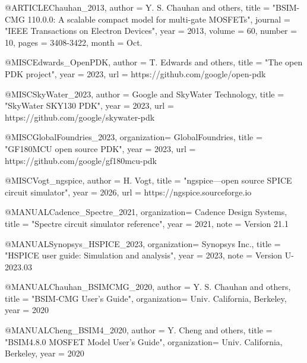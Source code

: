 \documentclass[conference]{IEEEtran}
\begin{document}
\begin{thebibliography}
@ARTICLE{Chauhan_2013,
    author      =   {Y. S. {Chauhan} and others},
    title       =   "{BSIM-CMG 110.0.0: A scalable compact model for multi-gate {MOSFETs}}",
    journal     =   "{IEEE Transactions on Electron Devices}",
    year        =   {2013},
    volume      =   {60},
    number      =   {10},
    pages       =   {3408-3422},
    month       =   {Oct.}
}

@MISC{Edwards_OpenPDK,
    author      =   {T. {Edwards} and others},
    title       =   "{The open {PDK} project}",
    year        =   {2023},
    url         =   {https://github.com/google/open-pdk}
}

@MISC{SkyWater_2023,
    author      =   {{Google} and {SkyWater Technology}},
    title       =   "{SkyWater SKY130 {PDK}}",
    year        =   {2023},
    url         =   {https://github.com/google/skywater-pdk}
}

@MISC{GlobalFoundries_2023,
    organization=   {GlobalFoundries},
    title       =   "{GF180MCU open source {PDK}}",
    year        =   {2023},
    url         =   {https://github.com/google/gf180mcu-pdk}
}


@MISC{Vogt_ngspice,
    author      =   {H. {Vogt}},
    title       =   "{ngspice---open source {SPICE} circuit simulator}",
    year        =   {2026},
    url         =   {https://ngspice.sourceforge.io}
}

@MANUAL{Cadence_Spectre_2021,
    organization=   {Cadence Design Systems},
    title       =   "{Spectre circuit simulator reference}",
    year        =   {2021},
    note        =   {Version 21.1}
}

@MANUAL{Synopsys_HSPICE_2023,
    organization=   {Synopsys Inc.},
    title       =   "{HSPICE user guide: Simulation and analysis}",
    year        =   {2023},
    note        =   {Version U-2023.03}
}

@MANUAL{Chauhan_BSIMCMG_2020,
    author      =   {Y. S. {Chauhan} and others},
    title       =   "{BSIM-CMG User's Guide}",
    organization=   {Univ. California, Berkeley},
    year        =   {2020}
}

@MANUAL{Cheng_BSIM4_2020,
    author      =   {Y. {Cheng} and others},
    title       =   "{BSIM4.8.0 {MOSFET} Model User's Guide}",
    organization=   {Univ. California, Berkeley},
    year        =   {2020}
}


\end{thebibliography}
\end{document}
